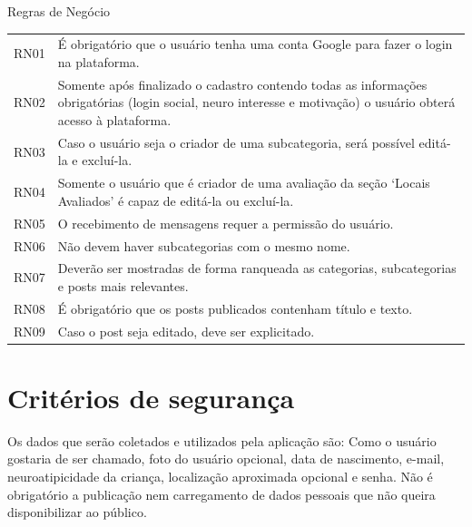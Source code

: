 

\begin{quadro}[htb]
	\centering
	\ABNTEXfontereduzida
	\caption[Regras de Negócio]{Regras de Negócio}
	\label{regra-negocio}
	\begin{tabular}{|p{3.3cm}|p{10.3cm}|}
		\hline
		\thead{Código} & \thead{Regra de negócio} \\
		\hline
		RN01 & É obrigatório que o usuário tenha uma conta Google para fazer o login na plataforma. \\
		\hline
		RN02 & Somente após finalizado o cadastro contendo todas as informações obrigatórias (login social, neuro interesse e motivação) o usuário obterá acesso à plataforma.\\
		\hline
		RN03 & Caso o usuário seja o criador de uma subcategoria, será possível editá-la e excluí-la.  \\
		\hline
		RN04 & Somente o usuário que é criador de uma avaliação da seção ‘Locais Avaliados’ é capaz de editá-la ou excluí-la. \\
		\hline
		RN05 & O recebimento de mensagens requer a permissão do usuário. \\
		\hline
		RN06 & Não devem haver subcategorias com o mesmo nome. \\
		\hline
		RN07 & Deverão ser mostradas de forma ranqueada as categorias, subcategorias e posts mais relevantes.\\
		\hline
		RN08 & É obrigatório que os posts publicados contenham título e texto.\\
		\hline
		RN09 & Caso o post seja editado, deve ser explicitado.\\
		\hline
	\end{tabular}
\end{quadro}\pagebreak



\section{Critérios de segurança}


 Os dados que serão coletados e utilizados pela aplicação são: Como o usuário gostaria de ser chamado, foto do usuário opcional, data de nascimento, e-mail, neuroatipicidade da criança, localização aproximada opcional e senha. Não é obrigatório a publicação nem carregamento de dados pessoais que não queira disponibilizar ao público.

